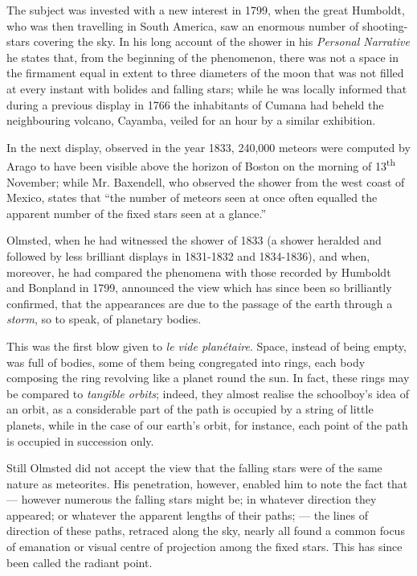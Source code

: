 \documentclass[a4paper, 12pt, oneside, polutonikogreek, english]{article}
\begin{document}
The subject was invested with a new interest in 1799, when the great Humboldt, who was then travelling in South America, saw an enormous number of shooting-stars covering the sky. In his long account of the shower in his \emph{Personal Narrative} he states that, from the beginning of the phenomenon, there was not a space in the firmament equal in extent to three diameters of the moon that was not filled at every instant with bolides and falling stars; while he was locally informed that during a previous display in 1766 the inhabitants of Cumana had beheld the neighbouring volcano, Cayamba, veiled for an hour by a similar exhibition.

In the next display, observed in the year 1833, 240,000 meteors were computed by Arago to have been visible above the horizon of Boston on the morning of 13\textsuperscript{th} November; while Mr. Baxendell, who observed the shower from the west coast of Mexico, states that ``the number of meteors seen at once often equalled the apparent number of the fixed stars seen at a glance.''

Olmsted, when he had witnessed the shower of 1833 (a shower heralded and followed by less brilliant displays in 1831-1832 and 1834-1836), and when, moreover, he had compared the phenomena with those recorded by Humboldt and Bonpland in 1799, announced the view which has since been so brilliantly confirmed, that the appearances are due to the passage of the earth through a \emph{storm}, so to speak, of planetary bodies.

This was the first blow given to \emph{le vide planétaire}. Space, instead of being empty, was full of bodies, some of them being congregated into rings, each body composing the ring revolving like a planet round the sun. In fact, these rings may be compared to \emph{tangible orbits}; indeed, they almost realise the schoolboy's idea of an orbit, as a considerable part of the path is occupied by a string of little planets, while in the case of our earth's orbit, for instance, each point of the path is occupied in succession only.

Still Olmsted did not accept the view that the falling stars were of the same nature as meteorites. His penetration, however, enabled him to note the fact that --- however numerous the falling stars might be; in whatever direction they appeared; or whatever the apparent lengths of their paths; --- the lines of direction of these paths, retraced along the sky, nearly all found a common focus of emanation or visual centre of projection among the fixed stars. This has since been called the radiant point.
\end{document}
